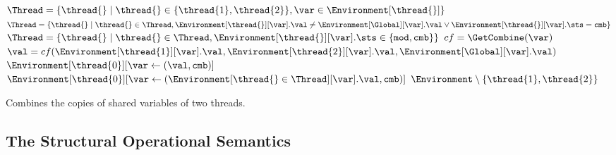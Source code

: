 \begin{algorithm}[t]
	\begin{algorithmic}[1]
			\ForAll {$\var \in \Shared(\Global)$}										\label{algo:Combine_for}
				\State $\Thread = \lbrace \thread{} \mid \thread{} \in \lbrace \thread{1}, \thread{2} \rbrace, \var \in \Environment[\thread{}] \rbrace$		\label{algo:Combine_default}
					\State $\Thread = \lbrace \thread{} \mid \thread{} \in \Thread, \Environment[\thread{}][\var].\val \neq \Environment[\Global][\var].\val \lor \Environment[\thread{}][\var].\sts = \texttt{cmb} \rbrace$	\label{algo:Combine_new}
					\State $\Thread = \lbrace \thread{} \mid \thread{} \in \Thread, \Environment[\thread{}][\var].\sts \in \{ \texttt{mod}, \texttt{cmb} \} \rbrace$						\label{algo:Combine_mod}
				\EndIf	\label{algo:Combine_endif1}
					\label{algo:Combine_if}
					\State $cf = \GetCombine(\var)$													\label{algo:Combine_c}
					\State $\val = cf(\Environment[\thread{1}][\var].\val, \Environment[\thread{2}][\var].\val, \Environment[\Global][\var].\val)$	\label{algo:Combine_combine}
					\State $\Environment[\thread{0}][\var \gets (\val, \texttt{cmb}) ]$	\label{algo:Combine_assign2}
					\State $\Environment[\thread{0}][\var \gets (\Environment[\thread{} \in \Thread][\var].\val, \texttt{cmb}) ]$	\label{algo:Combine_assign1}
				\EndIf	\label{algo:Combine_endif2}
			\EndFor
			\State \Return $\Environment \setminus \{ \thread{1}, \thread{2} \}$															\label{algo:Combine_return}
		\EndFunction
	\end{algorithmic}
	
	\caption{Combines the copies of shared variables of two threads.}
	\label{algo:Combine}
\end{algorithm}



\subsection{The Structural Operational Semantics}

